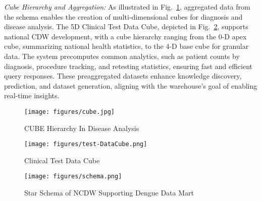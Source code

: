 \vspace{-2mm}
\textit{Cube Hierarchy and Aggregation:} As illustrated in Fig.~\ref{fig:cube}, aggregated data from the schema enables the creation of multi-dimensional cubes for diagnosis and disease analysis. The 5D Clinical Test Data Cube, depicted in Fig.~\ref{fig:testdatacube}, supports national CDW development, with a cube hierarchy ranging from the 0-D apex cube, summarizing national health statistics, to the 4-D base cube for granular data. The system precomputes common analytics, such as patient counts by diagnosis, procedure tracking, and retesting statistics, ensuring fast and efficient query responses. These preaggregated datasets enhance knowledge discovery, prediction, and dataset generation, aligning with the warehouse's goal of enabling real-time insights.

\begin{figure}[!ht]
    \centering
    \texttt{[image: figures/cube.jpg]}
    \caption{CUBE Hierarchy In Disease Analysis}
    \label{fig:cube}
\end{figure}


\begin{figure}[!ht]
    \centering
    \texttt{[image: figures/test-DataCube.png]}
    \caption{Clinical Test Data Cube}
    \label{fig:testdatacube}
    \vspace{-6.5mm}
\end{figure}

\begin{figure}[!ht]
    \centering
    \texttt{[image: figures/schema.png]}
    \caption{Star Schema of NCDW Supporting Dengue Data Mart}
    \label{fig:star_schema}
    \vspace{-5mm}
\end{figure}



